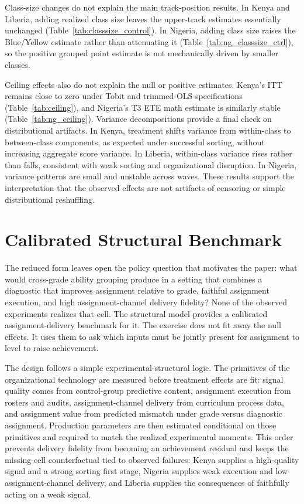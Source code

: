 \documentclass[11pt]{article}
\begin{document}
Class-size changes do not explain the main track-position results. In Kenya and Liberia, adding realized class size leaves the upper-track estimates essentially unchanged (Table~\ref{tab:classsize_control}). In Nigeria, adding class size raises the Blue/Yellow estimate rather than attenuating it (Table~\ref{tab:ng_classsize_ctrl}), so the positive grouped point estimate is not mechanically driven by smaller classes.

Ceiling effects also do not explain the null or positive estimates. Kenya's ITT remains close to zero under Tobit and trimmed-OLS specifications (Table~\ref{tab:ceiling}), and Nigeria's T3 ETE math estimate is similarly stable (Table~\ref{tab:ng_ceiling}). Variance decompositions provide a final check on distributional artifacts. In Kenya, treatment shifts variance from within-class to between-class components, as expected under successful sorting, without increasing aggregate score variance. In Liberia, within-class variance rises rather than falls, consistent with weak sorting and organizational disruption. In Nigeria, variance patterns are small and unstable across waves. These results support the interpretation that the observed effects are not artifacts of censoring or simple distributional reshuffling.



\section{Calibrated Structural Benchmark}
\label{sec:structural}

The reduced form leaves open the policy question that motivates the paper: what would cross-grade ability grouping produce in a setting that combines a diagnostic that improves assignment relative to grade, faithful assignment execution, and high assignment-channel delivery fidelity? None of the observed experiments realizes that cell. The structural model provides a calibrated assignment-delivery benchmark for it. The exercise does not fit away the null effects. It uses them to ask which inputs must be jointly present for assignment to level to raise achievement.

The design follows a simple experimental-structural logic. The primitives of the organizational technology are measured before treatment effects are fit: signal quality comes from control-group predictive content, assignment execution from rosters and audits, assignment-channel delivery from curriculum process data, and assignment value from predicted mismatch under grade versus diagnostic assignment. Production parameters are then estimated conditional on those primitives and required to match the realized experimental moments. This order prevents delivery fidelity from becoming an achievement residual and keeps the missing-cell counterfactual tied to observed failures: Kenya supplies a high-quality signal and a strong sorting first stage, Nigeria supplies weak execution and low assignment-channel delivery, and Liberia supplies the consequences of faithfully acting on a weak signal.
\end{document}
